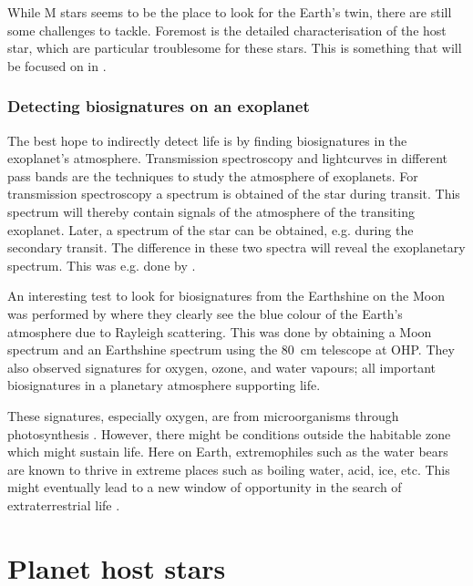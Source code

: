 While M stars seems to be the place to look for the Earth's twin, there are still some challenges to
tackle. Foremost is the detailed characterisation of the host star, which are particular troublesome
for these stars. This is something that will be focused on in .

\subsubsection{Detecting biosignatures on an exoplanet}

The best hope to indirectly detect life is by finding biosignatures \citep[see
e.g.]{Kasting2002,Snellen2013} in the exoplanet's atmosphere. Transmission spectroscopy and
lightcurves in different pass bands are the techniques to study the atmosphere of exoplanets. For
transmission spectroscopy a spectrum is obtained of the star during transit. This spectrum will
thereby contain signals of the atmosphere of the transiting exoplanet. Later, a spectrum of the star
can be obtained, e.g. during the secondary transit. The difference in these two spectra will reveal
the exoplanetary spectrum. This was e.g. done by \citet{Charbonneau2002}.

An interesting test to look for biosignatures from the Earthshine on the Moon was performed by
\citet{Arnold2002} where they clearly see the blue colour of the Earth's atmosphere due to Rayleigh
scattering. This was done by obtaining a Moon spectrum and an Earthshine spectrum using the
\SI{80}{cm} telescope at OHP. They also observed signatures for oxygen, ozone, and water vapours;
all important biosignatures in a planetary atmosphere supporting life.

These signatures, especially oxygen, are from microorganisms through photosynthesis
\citep[see e.g.][]{Kasting2002}. However, there might be conditions outside the habitable zone which
might sustain life. Here on Earth, extremophiles such as the water bears are known to thrive in
extreme places such as boiling water, acid, ice, etc. This might eventually lead to a new window of
opportunity in the search of extraterrestrial life \citep{Cavicchioli2002}.



\section{Planet host stars}
\label{sec:planet_host_stars}

